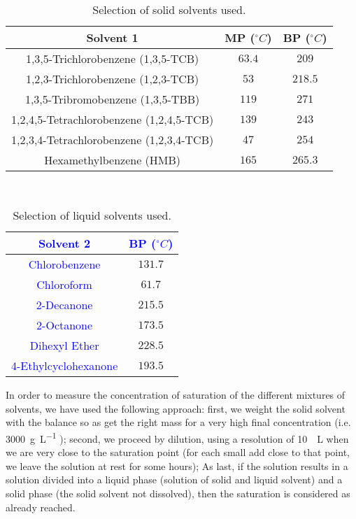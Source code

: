 \documentclass  [
  paper    = a4,
  BCOR     = 10mm,
  twoside,
  fontsize = 12pt,
  fleqn,
  toc      = bibnumbered,
  toc      = listofnumbered,
  numbers  = noendperiod,
  headings = normal,
  listof   = leveldown,
  version  = 3.03
]                                       {scrreprt}
\begin{document}
\begin{table*}[tb]\scriptsize
	\caption{\small Selection of solid solvents used.}
	\label{tab:solids}
	~\\
	\centering
	\begin{tabular}{ccc}
		\textbf{Solvent 1} & \textbf{MP ($^\circ C$)} & \textbf{BP ($^\circ C$)}\\
		\hline
		1,3,5-Trichlorobenzene (1,3,5-TCB) & $63.4$ & $209$\\
		1,2,3-Trichlorobenzene (1,2,3-TCB) & $53$ & $218.5$\\
		1,3,5-Tribromobenzene (1,3,5-TBB) & $119$ & $271$\\
		1,2,4,5-Tetrachlorobenzene (1,2,4,5-TCB) & $139$ & $243$\\
		1,2,3,4-Tetrachlorobenzene (1,2,3,4-TCB) & $47$ & $254$\\
		Hexamethylbenzene (HMB) & $165$ & $265.3$\\
		\hline
	\end{tabular}
\end{table*}

\begin{table*}[tb]\scriptsize
	\caption{\small Selection of liquid solvents used.}
	\label{tab:liquids}
	~\\
	\centering
	\begin{tabular}{cc}
		\textcolor{blue}{\textbf{Solvent 2}} & \textcolor{blue}{\textbf{BP ($^\circ C$)}}\\
		\hline
		\textcolor{blue}{Chlorobenzene} & $131.7$\\
		\textcolor{blue}{Chloroform} & $61.7$\\
		\textcolor{blue}{2-Decanone} & $215.5$\\
		\textcolor{blue}{2-Octanone} & $173.5$\\
		\textcolor{blue}{Dihexyl Ether} & $228.5$\\
		\textcolor{blue}{4-Ethylcyclohexanone} & $193.5$\\
		\hline
	\end{tabular}
\end{table*}

In order to measure the concentration of saturation of the different mixtures of solvents, we have used the following approach: first, we weight the solid solvent with the balance so as get the right mass for a very high final concentration (i.e. \SI[per-mode=symbol]{3000}{\gram\per\liter} ); second, we proceed by dilution, using a resolution of \SI{10}{\mu L} when we are very close to the saturation point (for each small add close to that point, we leave the solution at rest for some hours); As last, if the solution results in a solution divided into a liquid phase (solution of solid and liquid solvent) and a solid phase (the solid solvent not dissolved), then the saturation is considered as already reached. \\
\end{document}

